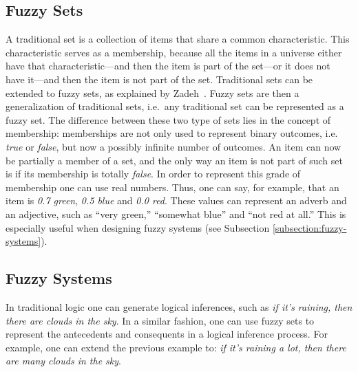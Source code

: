 \documentclass{ieeeaccess}
\begin{document}
\subsection{Fuzzy Sets}
\label{subsection:fuzzy-sets}

A traditional set is a collection of items that share a common
characteristic. This characteristic serves as a membership, because all the
items in a universe either have that characteristic---and then the item is
part of the set---or it does not have it---and then the item is not part of
the set. Traditional sets can be extended to fuzzy sets, as explained by
Zadeh~\cite{Zadeh1965}.
Fuzzy sets are then a generalization of traditional sets,
i.e.\ any traditional set can be represented as a fuzzy set. The difference
between these two type of sets lies in the concept of membership: memberships
are not only used to represent binary outcomes, i.e. \textit{true} or
\textit{false}, but now a possibly infinite number of outcomes. An item can now
be partially a member of a set, and the only way an item is not part of such set
is if its membership is totally \textit{false}. In order to represent this grade
of membership one can use real numbers. Thus, one can say, for example, that an
item is \textit{0.7 green}, \textit{0.5 blue} and \textit{0.0 red}. These values
can represent an adverb and an adjective, such as ``very green,'' ``somewhat
blue'' and ``not red at all.'' This is especially useful when designing fuzzy
systems (see Subsection \ref{subsection:fuzzy-systems}).

\subsection{Fuzzy Systems}
\label{subsection:explaining-fuzzy-systems}


In traditional logic one can generate logical inferences, such as \textit{if
it's raining, then there are clouds in the sky}. In a similar fashion, one can
use fuzzy sets to represent the antecedents and consequents in a logical
inference process. For example, one can extend the previous example to:
\textit{if it's raining a lot, then there are many clouds in the sky}.
\end{document}
